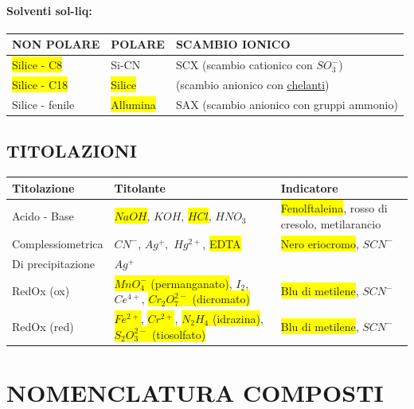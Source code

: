 \documentclass{article}
\begin{document}
\paragraph{Solventi sol-liq: }
\begin{center}
\begin{tabular}{l|l|l}
	\toprule
	NON POLARE & POLARE & SCAMBIO IONICO \\
	\midrule
	\colorbox{yellow}{Silice - C8} & Si-CN & SCX (scambio cationico con $SO_3^-$) \\
	\colorbox{yellow}{Silice - C18} & \colorbox{yellow}{Silice} & (scambio anionico con \underline{chelanti}) \\
	Silice - fenile & \colorbox{yellow}{Allumina} & SAX (scambio anionico con gruppi ammonio) \\
	\bottomrule
\end{tabular}
\end{center}

\subsection{TITOLAZIONI}
\begin{center}
\begin{tabular}{l|l|l}
	\toprule
	Titolazione & Titolante & Indicatore \\
	\midrule
	Acido - Base & \colorbox{yellow}{$NaOH$}, $KOH$, \colorbox{yellow}{$HCl$}, $HNO_3$ & \colorbox{yellow}{Fenolftaleina}, rosso di cresolo, metilarancio \\
	Complessiometrica & $CN^-$, $Ag^+,$ $Hg^{2+}$, \colorbox{yellow}{EDTA} & \colorbox{yellow}{Nero eriocromo}, $SCN^-$ \\
	Di precipitazione & $Ag^+$ & \\
	RedOx (ox) & \colorbox{yellow}{$MnO_4^-$ (permanganato)}, $I_2$, $Ce^{4+}$, \colorbox{yellow}{$Cr_2O_7^{2-}$ (dicromato)} & \colorbox{yellow}{Blu di metilene}, $SCN^-$ \\
	RedOx (red) & \colorbox{yellow}{$Fe^{2+}$}, \colorbox{yellow}{$Cr^{2+}$}, \colorbox{yellow}{$N_2H_4$ (idrazina)}, \colorbox{yellow}{$S_2O_3^{2-}$ (tiosolfato)} & \colorbox{yellow}{Blu di metilene}, $SCN^-$ \\
	\bottomrule
\end{tabular}
\end{center}

\newpage

\section{NOMENCLATURA COMPOSTI}
\end{document}
